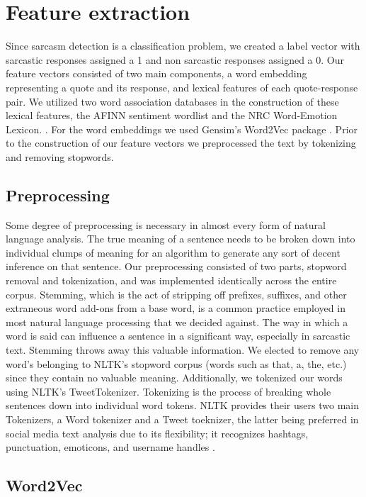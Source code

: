 \documentclass{article}
\begin{document}
\section{Feature extraction}

Since sarcasm detection is a classification problem, we created a label vector with sarcastic responses assigned a 1 and non sarcastic responses assigned a 0. Our feature vectors consisted of two main components, a word embedding representing a quote and its response, and lexical features of each quote-response pair. We utilized two word association databases in the construction of these lexical features, the AFINN sentiment wordlist and the NRC Word-Emotion Lexicon. \citep{NielsenF2011New, Mohammad13}. For the word embeddings we used Gensim's Word2Vec package \citep{rehurek_lrec}. Prior to the construction of our feature vectors we preprocessed the text by tokenizing and removing stopwords. 

\subsection{Preprocessing}

Some degree of preprocessing is necessary in almost every form of natural language analysis. The true meaning of a sentence needs to be broken down into individual clumps of meaning for an algorithm to generate any sort of decent inference on that sentence. Our preprocessing consisted of two parts, stopword removal and tokenization, and was implemented identically across the entire corpus. Stemming, which is the act of stripping off prefixes, suffixes, and other extraneous word add-ons from a base word, is a common practice employed in most natural language processing that we decided against. The way in which a word is said can influence a sentence in a significant way, especially in sarcastic text. Stemming throws away this valuable information. We elected to remove any word's belonging to NLTK's stopword corpus (words such as that, a, the, etc.) since they contain no valuable meaning. Additionally, we tokenized our words using NLTK's TweetTokenizer. Tokenizing is the process of breaking whole sentences down into individual word tokens. NLTK provides their users two main Tokenizers, a Word tokenizer and a Tweet toeknizer, the latter being preferred in social media text analysis due to its flexibility; it recognizes hashtags, punctuation, emoticons, and username handles \citep{BirdKleinLoper09}. 

\subsection{Word2Vec}
\end{document}
